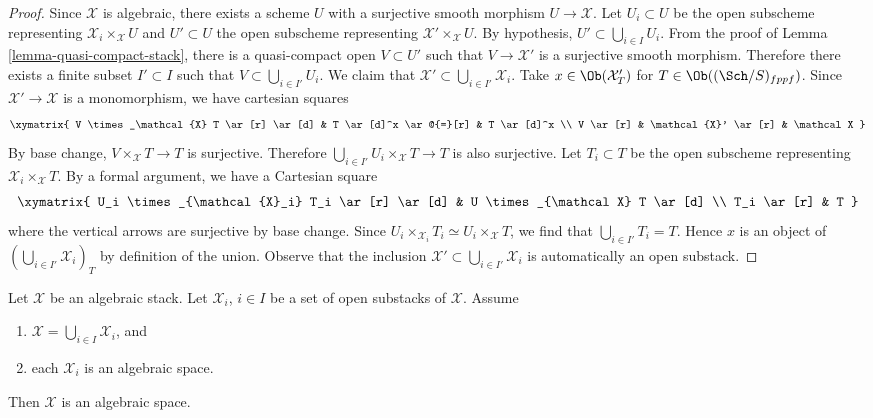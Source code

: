 \begin{proof}
Since $\mathcal X$ is algebraic, there exists a scheme $U$ with a surjective
smooth morphism $U \to \mathcal X$. Let $U_i \subset U$ be the open subscheme
representing $\mathcal{X}_i \times_{\mathcal X} U$ and $U' \subset U$ the
open subscheme representing $\mathcal{X}' \times_{\mathcal X} U$. By
hypothesis, $U'\subset \bigcup_{i\in I} U_i$. From the proof of
Lemma \ref{lemma-quasi-compact-stack},
there is a quasi-compact open $V \subset U'$ such that $V \to \mathcal{X}'$
is a surjective smooth morphism. Therefore there exists a finite subset
$I' \subset I$ such that $V \subset \bigcup_{i \in I'}
U_i$. We claim that $\mathcal{X}' \subset \bigcup_{i \in I'} \mathcal{X}_i$.
Take $x \in \Ob(\mathcal{X}'_T)$ for
$T \in \Ob((\Sch/S)_{fppf})$.
Since $\mathcal{X}' \to \mathcal{X}$ is a monomorphism, we have cartesian
squares
$$
\xymatrix{
V \times_\mathcal{X} T \ar[r] \ar[d] &
T \ar[d]^x \ar@{=}[r] &
T \ar[d]^x \\
V \ar[r] &
\mathcal{X}' \ar[r] &
\mathcal X
}
$$
By base change, $V \times_{\mathcal X} T \to T$ is surjective. Therefore
$\bigcup_{i \in I'} U_i \times_{\mathcal X} T \to T$ is also surjective.
Let $T_i \subset T$ be the open subscheme representing
$\mathcal{X}_i \times_{\mathcal X} T$.
By a formal argument, we have a Cartesian square
$$
\xymatrix{
U_i \times_{\mathcal{X}_i} T_i \ar[r] \ar[d] &
U \times_{\mathcal X} T \ar[d] \\
T_i \ar[r] & T
}
$$
where the vertical arrows are surjective by base change. Since
$U_i \times_{\mathcal{X}_i} T_i \simeq U_i \times_{\mathcal X} T$,
we find that $\bigcup_{i \in I'} T_i = T$. Hence
$x$ is an object of $(\bigcup_{i\in I'} \mathcal{X}_i)_T$ by
definition of the union. Observe that the inclusion
$\mathcal{X}' \subset \bigcup_{i \in I'} \mathcal{X}_i$
is automatically an open substack.
\end{proof}

\begin{lemma}
\label{lemma-zariski-open-cover-stack-is-space}
Let $\mathcal X$ be an algebraic stack.
Let $\mathcal{X}_i$, $i \in I$ be a set of open substacks of $\mathcal{X}$.
Assume
\begin{enumerate}
\item $\mathcal{X} = \bigcup_{i \in I} \mathcal{X}_i$, and
\item each $\mathcal{X}_i$ is an algebraic space.
\end{enumerate}
Then $\mathcal{X}$ is an algebraic space.
\end{lemma}

